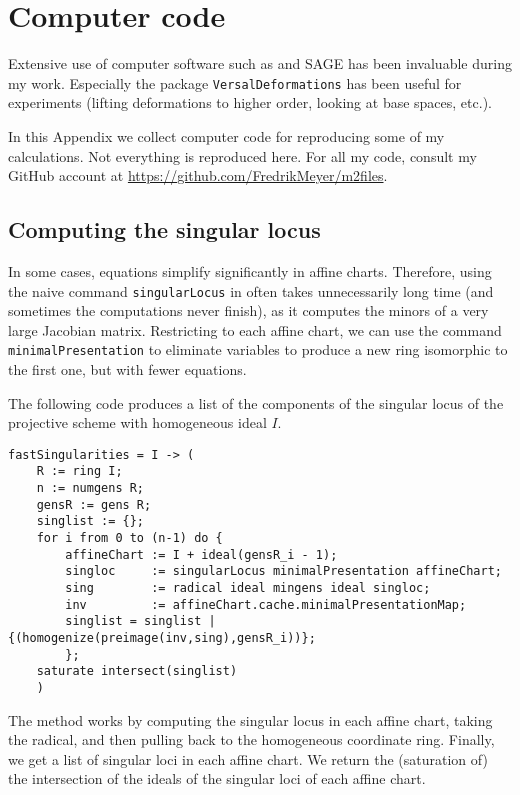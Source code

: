 \chapter{Computer code}
\label{sec:computercode}

Extensive use of computer software such as \MM \cite{M2} and SAGE \cite{sagemath} has been invaluable during my work. Especially the \MM package \texttt{VersalDeformations} \cite{ilten_versaldeformations} has been useful for experiments (lifting deformations to higher order, looking at base spaces, etc.).

In this Appendix we collect computer code for reproducing some of my calculations. Not everything is reproduced here. For all my code, consult my GitHub account at \url{https://github.com/FredrikMeyer/m2files}.

\section{Computing the singular locus}

In some cases, equations simplify significantly in affine charts. Therefore, using the naive command \texttt{singularLocus} in \MM often takes unnecessarily long time (and sometimes the computations never finish), as it computes the minors of a very large Jacobian matrix. Restricting to each affine chart, we can use the command \texttt{minimalPresentation} to eliminate variables to produce a new ring isomorphic to the first one, but with fewer equations.

The following code produces a list of the components of the singular locus of the projective scheme with homogeneous ideal $I$.

\begin{minipage}{\linewidth}
\begin{lstlisting}[language=Macaulay2]
fastSingularities = I -> (
    R := ring I;
    n := numgens R;
    gensR := gens R;
    singlist := {};
    for i from 0 to (n-1) do {
        affineChart := I + ideal(gensR_i - 1);
        singloc     := singularLocus minimalPresentation affineChart;
        sing        := radical ideal mingens ideal singloc;
        inv         := affineChart.cache.minimalPresentationMap;
        singlist = singlist | {(homogenize(preimage(inv,sing),gensR_i))};
        };
    saturate intersect(singlist)
    )
\end{lstlisting}
\end{minipage}

The method works by computing the singular locus in each affine chart, taking the radical, and then pulling back to the homogeneous coordinate ring. Finally, we get a list of singular loci in each affine chart. We return the (saturation of) the intersection of the ideals of the singular loci of each affine chart.

